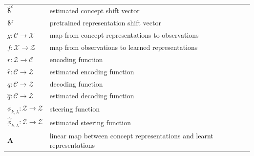 \documentclass{article}
\newcommand{\z}{\mathbf{z}}
\newcommand{\A}{\mathbf{A}}
\newcommand{\q}{\mathbf{q}}
\newcommand{\br}{\mathbf{r}}
\newcommand{\s}{\mathbf{s}}
\newcommand{\C}{\mathcal{C}}
\newcommand{\Z}{\mathcal{Z}}
\newcommand{\X}{\mathcal{X}}
\newcommand{\deltaBold}{\boldsymbol{\delta}}
\newcommand{\deltaz}{\deltaBold^z}
\newcommand{\deltac}{\deltaBold^c}
\newcommand{\hatdeltac}{\hat{\deltaBold}^c}
\begin{document}
\begin{tabular}{>{\centering\arraybackslash}p{2.25in} >{\arraybackslash}p{3.15in}}
$\hatdeltac$ & estimated concept shift vector  \\
$\deltaz$ & pretrained representation shift vector  \\
$\displaystyle g : \C \rightarrow \X$ & map from concept representations to observations\\
$\displaystyle f : \X \rightarrow \Z$ & map from observations to learned representations \\
$\displaystyle r : \Z \rightarrow \C$ & encoding function \\
$\displaystyle \hat{r} : \C \rightarrow \Z$ & estimated encoding function \\
$\displaystyle q : \C \rightarrow \Z$ & decoding function\\
$\displaystyle \hat{q} : \C \rightarrow \Z$ & estimated decoding function \\
$\displaystyle \phi_{k, \lambda} : \Z \rightarrow \Z$ & steering function \\
$\displaystyle \hat{\phi}_{k, \lambda} : \Z \rightarrow \Z$ & estimated steering function \\
$\displaystyle \A$ & linear map between concept representations and learnt representations\\




\end{tabular}


\end{document}
